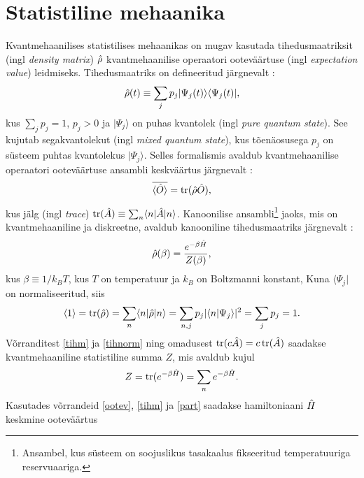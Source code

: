 \documentclass{trkut}%
\DeclareMathOperator{\tr}{tr}
\renewcommand\bra[1]{{\langle{#1}|}}
\renewcommand\ket[1]{{|{#1}\rangle}}
\renewcommand\braket[1]{\langle{#1}\rangle}
\begin{document}
\section{Statistiline mehaanika}
Kvantmehaanilises statistilises mehaanikas on mugav kasutada tihedusmaatriksit (ingl \textit{density matrix}) $\op{\rho}$ kvantmehaanilise operaatori ooteväärtuse (ingl \textit{expectation value}) leidmiseks.
Tihedusmaatriks on defineeritud järgnevalt \parencite[172]{kardar07}:
\begin{equation}
    \op{\rho}(t) \equiv \sum_j p_j \ket{\Psi_j(t)} \bra{\Psi_j(t)},
\end{equation}
kus $\sum_j p_j=1$, $p_j > 0$ ja $\ket{\Psi_j}$ on puhas kvantolek (ingl \textit{pure quantum state}).
See kujutab segakvantolekut (ingl \textit{mixed quantum state}), kus tõenäosusega $p_j$ on süsteem puhtas kvantolekus $\ket{\Psi_j}$.
Selles formalismis avaldub kvantmehaanilise operaatori ooteväärtuse ansambli keskväärtus järgnevalt \parencite[172]{kardar07}:
\begin{equation}
    \overline{\braket{\op{O}}}=\tr(\op{\rho}\op{O}),
    \label{ootev}
\end{equation}
kus jälg (ingl \textit{trace}) $\tr(\op{A}) \equiv \sum_n \braket{n|\op{A}|n}$. %
Kanoonilise ansambli\footnote{Ansambel, kus süsteem on soojuslikus tasakaalus fikseeritud temperatuuriga reservuaariga.} jaoks, mis on kvantmehaaniline ja diskreetne, avaldub kanooniline tihedusmaatriks järgnevalt \parencite[174]{kardar07}:
\begin{equation}
    \op{\rho}(\beta) = \frac{e^{-\beta \op{H}}}{Z(\beta)},
    \label{tihm}
\end{equation}
kus $\beta \equiv 1/k_B T$, kus $T$ on temperatuur ja $k_B$ on Boltzmanni konstant,
Kuna $\bra{\Psi_j}$ on normaliseeritud, siis
\begin{equation}
    \braket{1}=\tr(\op{\rho})=\sum_n \braket{n|\op{\rho}|n}=\sum_{n, j} p_j |\braket{n| \Psi_j}|^2=\sum_j p_j=1.
    \label{tihnorm}
\end{equation}
Võrranditest \eqref{tihm} ja \eqref{tihnorm} ning omadusest $\tr(c\op{A})=c\tr(\op{A})$ saadakse kvantmehaaniline statistiline summa $Z$, mis avaldub kujul
\begin{equation}
    Z=\tr(e^{-\beta \op{H}})=\sum_n e^{-\beta \op{H}}.
    \label{part}
\end{equation}
Kasutades võrrandeid \eqref{ootev}, \eqref{tihm} ja \eqref{part} saadakse hamiltoniaani $\op{H}$ keskmine ooteväärtus
\end{document}

